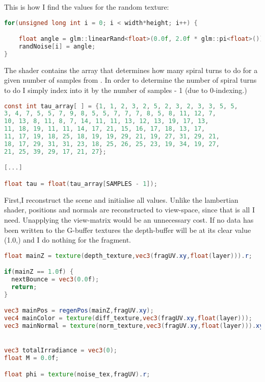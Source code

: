 This is how I find the values for the random texture:
\begin{lstlisting}[caption={Filters.cpp},language=c++]
for(unsigned long int i = 0; i < width*height; i++) {

	float angle = glm::linearRand<float>(0.0f, 2.0f * glm::pi<float>());
	randNoise[i] = angle;
}
\end{lstlisting}

The shader contains the array that determines how many spiral turns to do for a given number of samples from \cite{deep-g-buffer}. In order to determine the number of spiral turns to do I simply index into it by the number of samples - 1 (due to 0-indexing.)
\begin{lstlisting}[caption={apply\_rad\_bounce.frag},language=GLSL]
const int tau_array[ ] = {1, 1, 2, 3, 2, 5, 2, 3, 2, 3, 3, 5, 5,
3, 4, 7, 5, 5, 7, 9, 8, 5, 5, 7, 7, 7, 8, 5, 8, 11, 12, 7,
10, 13, 8, 11, 8, 7, 14, 11, 11, 13, 12, 13, 19, 17, 13,
11, 18, 19, 11, 11, 14, 17, 21, 15, 16, 17, 18, 13, 17,
11, 17, 19, 18, 25, 18, 19, 19, 29, 21, 19, 27, 31, 29, 21,
18, 17, 29, 31, 31, 23, 18, 25, 26, 25, 23, 19, 34, 19, 27,
21, 25, 39, 29, 17, 21, 27};

[...]

float tau = float(tau_array[SAMPLES - 1]);
\end{lstlisting}

First,I reconstruct the scene and initialise all values. Unlike the lambertian shader, positions and normals are reconstructed to view-space, since that is all I need. Unapplying the view-matrix would be an unnecessary cost. If no data has been written to the G-buffer textures the depth-buffer will be at its clear value (1.0,) and I do nothing for the fragment.
\begin{lstlisting}[caption={apply\_rad\_bounce.frag},language=GLSL]
float mainZ = texture(depth_texture,vec3(fragUV.xy,float(layer))).r;

if(mainZ == 1.0f) {
  nextBounce = vec3(0.0f);
  return;
}

vec3 mainPos = regenPos(mainZ,fragUV.xy);
vec4 mainColor = texture(diff_texture,vec3(fragUV.xy,float(layer)));
vec3 mainNormal = texture(norm_texture,vec3(fragUV.xy,float(layer))).xyz;


vec3 totalIrradiance = vec3(0);
float M = 0.0f;

float phi = texture(noise_tex,fragUV).r;
\end{lstlisting}

